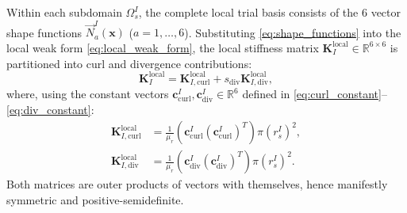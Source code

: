 \documentclass[VANCOUVER,Times1COL]{WileyNJD-v5}
\begin{document}
Within each subdomain $\Omega_s^I$, the complete local trial basis consists of the 6 vector shape functions $\vec{N}_a^I(\mathbf{x})$ ($a=1,\dots,6$). Substituting \eqref{eq:shape_functions} into the local weak form \eqref{eq:local_weak_form}, the local stiffness matrix $\mathbf{K}_I^{\mathrm{local}} \in \mathbb{R}^{6 \times 6}$ is partitioned into curl and divergence contributions:
\begin{equation}
    \mathbf{K}_I^{\mathrm{local}} = \mathbf{K}_{I, \mathrm{curl}}^{\mathrm{local}} + s_{\mathrm{div}} \mathbf{K}_{I, \mathrm{div}}^{\mathrm{local}},
\end{equation}
where, using the constant vectors $\mathbf{c}_{\mathrm{curl}}^I, \mathbf{c}_{\mathrm{div}}^I \in \mathbb{R}^6$ defined in \eqref{eq:curl_constant}--\eqref{eq:div_constant}:
\begin{align}
    \mathbf{K}_{I, \mathrm{curl}}^{\mathrm{local}} & = \frac{1}{\mu_r} \left( \mathbf{c}_{\mathrm{curl}}^I (\mathbf{c}_{\mathrm{curl}}^I)^T \right) \pi (r_s^I)^2, \label{eq:k_curl_analytic} \\
    \mathbf{K}_{I, \mathrm{div}}^{\mathrm{local}}  & = \frac{1}{\mu_r} \left( \mathbf{c}_{\mathrm{div}}^I (\mathbf{c}_{\mathrm{div}}^I)^T \right) \pi (r_s^I)^2. \label{eq:k_div_analytic}
\end{align}
Both matrices are outer products of vectors with themselves, hence manifestly symmetric and positive-semidefinite.
\end{document}
